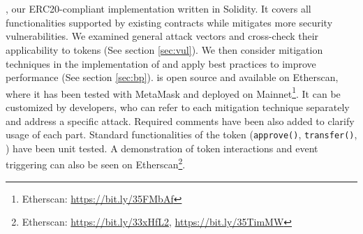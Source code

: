 

\section{\sys}\label{sec:proposal}
\sys, our ERC20-compliant implementation written in Solidity. {\blue It covers all functionalities supported by existing \erc contracts while mitigates more security vulnerabilities.} We examined general attack vectors and cross-check their applicability to \erc tokens (See section \ref{sec:vul}). {\blue We then consider mitigation techniques in the implementation of \sys and apply best practices to improve performance (See section \ref{sec:bp}).} \sys is open source and available on Etherscan, where it has been tested with MetaMask and deployed on Mainnet\footnote{Etherscan: \url{https://bit.ly/35FMbAf}}. It can be customized by developers, who can refer to each mitigation technique separately and address a specific attack. Required comments have been also added to clarify usage of each part. Standard functionalities of the token (\ie \texttt{approve()}, \texttt{transfer()}, \etc) have been unit tested. A demonstration of token interactions and event triggering can also be seen on Etherscan\footnote{Etherscan: \url{https://bit.ly/33xHfL2}, \url{https://bit.ly/35TimMW}}.


